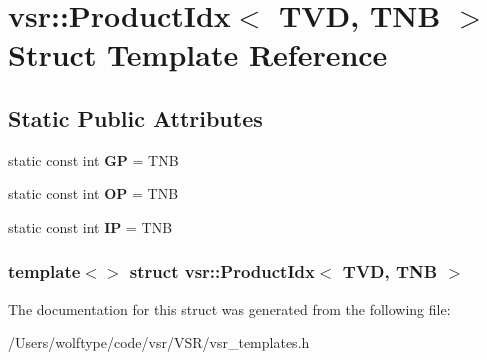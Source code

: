 \hypertarget{structvsr_1_1_product_idx_3_01_t_v_d_00_01_t_n_b_01_4}{\section{vsr\-:\-:Product\-Idx$<$ T\-V\-D, T\-N\-B $>$ Struct Template Reference}
\label{structvsr_1_1_product_idx_3_01_t_v_d_00_01_t_n_b_01_4}
}
\subsection*{Static Public Attributes}
\begin{DoxyCompactItemize}
\item 
\hypertarget{structvsr_1_1_product_idx_3_01_t_v_d_00_01_t_n_b_01_4_ad0b80e6bc49df31abb11ae4e5a202eec}{static const int {\bfseries G\-P} = T\-N\-B}\label{structvsr_1_1_product_idx_3_01_t_v_d_00_01_t_n_b_01_4_ad0b80e6bc49df31abb11ae4e5a202eec}

\item 
\hypertarget{structvsr_1_1_product_idx_3_01_t_v_d_00_01_t_n_b_01_4_a7fa890823dc645540ed05afd3d1da40c}{static const int {\bfseries O\-P} = T\-N\-B}\label{structvsr_1_1_product_idx_3_01_t_v_d_00_01_t_n_b_01_4_a7fa890823dc645540ed05afd3d1da40c}

\item 
\hypertarget{structvsr_1_1_product_idx_3_01_t_v_d_00_01_t_n_b_01_4_a3892236304f57a9b1e0258792f2577d1}{static const int {\bfseries I\-P} = T\-N\-B}\label{structvsr_1_1_product_idx_3_01_t_v_d_00_01_t_n_b_01_4_a3892236304f57a9b1e0258792f2577d1}

\end{DoxyCompactItemize}
\subsubsection*{template$<$$>$ struct vsr\-::\-Product\-Idx$<$ T\-V\-D, T\-N\-B $>$}



The documentation for this struct was generated from the following file\-:\begin{DoxyCompactItemize}
\item 
/\-Users/wolftype/code/vsr/\-V\-S\-R/vsr\-\_\-templates.\-h\end{DoxyCompactItemize}
